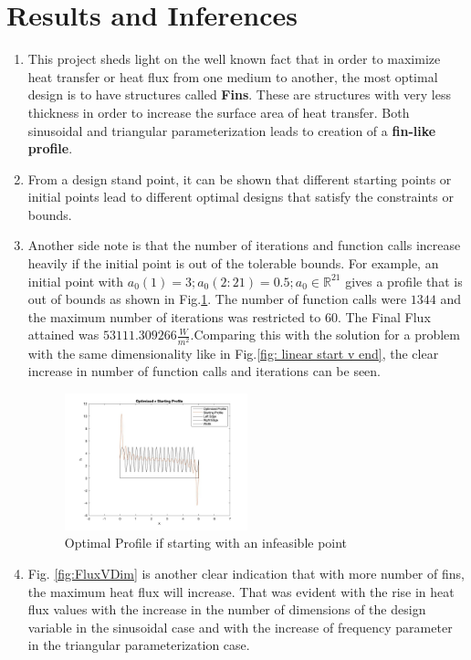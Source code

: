\documentclass{article}
\begin{document}
\section{Results and Inferences}
\begin{enumerate}
\item This project sheds light on the well known fact that in order to maximize heat transfer or heat flux from one medium to another, the most optimal design is to have structures called \textbf{Fins}. These are structures with very less thickness in order to increase the surface area of heat transfer. Both sinusoidal and triangular parameterization leads to creation of a \textbf{fin-like profile}. 
\item From a design stand point, it can be shown that different starting points or initial points lead to different optimal designs that satisfy the constraints or bounds. 
\item Another side note is that the number of iterations and function calls increase heavily if the initial point is out of the tolerable bounds. For example, an initial point with $a_0(1)=3; a_0(2:21)=0.5; a_0 \in \mathbb{R}^{21}$ gives a profile that is out of bounds as shown in Fig.\ref{fig: out of bounds}. The number of function calls were $1344$ and the maximum number of iterations was restricted to $60$. The Final Flux attained was $53111.309266 \frac{W}{m^2}$.Comparing this with the solution for a problem with the same dimensionality like in Fig.\ref{fig: linear start v end}, the clear increase in number of function calls and iterations can be seen. 
\begin{figure}[H]
\centering
\includegraphics[width =0.5\textwidth]{infeasible_sp}
\caption{Optimal Profile if starting with an infeasible point}
\label{fig: out of bounds}
\end{figure}
\item Fig. \ref{fig:FluxVDim} is another clear indication that with more number of fins, the maximum heat flux will increase. That was evident with the rise in heat flux values with the increase in the number of dimensions of the design variable in the sinusoidal case and with the increase of frequency parameter in the triangular parameterization case.

\end{enumerate}
\end{document}
